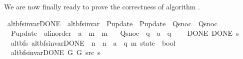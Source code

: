 \begin{isabellebody}
%
\endisatagdocument
{\isafolddocument}%
%
\isadelimdocument
%
\endisadelimdocument
%
\begin{isamarkuptext}%
We are now finally ready to prove the correctness of algorithm .%
\end{isamarkuptext}\isamarkuptrue%
\isamarkupfalse%
\ alt{\isacharunderscore}{\kern0pt}bfs{\isacharunderscore}{\kern0pt}invar{\isacharunderscore}{\kern0pt}DONE\ {\isacharequal}{\kern0pt}\ alt{\isacharunderscore}{\kern0pt}bfs{\isacharunderscore}{\kern0pt}invar\ \ P{\isacharunderscore}{\kern0pt}update\ {\isacharequal}{\kern0pt}\ P{\isacharunderscore}{\kern0pt}update\ \ Q{\isacharunderscore}{\kern0pt}snoc\ {\isacharequal}{\kern0pt}\ Q{\isacharunderscore}{\kern0pt}snoc\ \isanewline
\ \ P{\isacharunderscore}{\kern0pt}update\ {\isacharcolon}{\kern0pt}{\isacharcolon}{\kern0pt}\ {\isachardoublequoteopen}{\isacharprime}{\kern0pt}a{\isacharcolon}{\kern0pt}{\isacharcolon}{\kern0pt}linorder\ {\isasymRightarrow}\ {\isacharprime}{\kern0pt}a\ {\isasymRightarrow}\ {\isacharprime}{\kern0pt}m\ {\isasymRightarrow}\ {\isacharprime}{\kern0pt}m{\isachardoublequoteclose}\ \isanewline
\ \ Q{\isacharunderscore}{\kern0pt}snoc\ {\isacharcolon}{\kern0pt}{\isacharcolon}{\kern0pt}\ {\isachardoublequoteopen}{\isacharprime}{\kern0pt}q\ {\isasymRightarrow}\ {\isacharprime}{\kern0pt}a\ {\isasymRightarrow}\ {\isacharprime}{\kern0pt}q{\isachardoublequoteclose}\ {\isacharplus}{\kern0pt}\isanewline
\ \ \ DONE{\isacharcolon}{\kern0pt}\ {\isachardoublequoteopen}DONE\ s{\isachardoublequoteclose}\isanewline
%
\isadeliminvisible
\isanewline
%
\endisadeliminvisible
%
\isataginvisible
{}\isamarkupfalse%
\ {\isacharparenleft}{\kern0pt}\ alt{\isacharunderscore}{\kern0pt}bfs{\isacharparenright}{\kern0pt}\ alt{\isacharunderscore}{\kern0pt}bfs{\isacharunderscore}{\kern0pt}invar{\isacharunderscore}{\kern0pt}DONE{\isacharprime}{\kern0pt}\ {\isacharcolon}{\kern0pt}{\isacharcolon}{\kern0pt}\ {\isachardoublequoteopen}{\isacharprime}{\kern0pt}n\ {\isasymRightarrow}\ {\isacharprime}{\kern0pt}n\ {\isasymRightarrow}\ {\isacharprime}{\kern0pt}a\ {\isasymRightarrow}\ {\isacharparenleft}{\kern0pt}{\isacharprime}{\kern0pt}q{\isacharcomma}{\kern0pt}\ {\isacharprime}{\kern0pt}m{\isacharparenright}{\kern0pt}\ state\ {\isasymRightarrow}\ bool{\isachardoublequoteclose}\ \isanewline
\ \ {\isachardoublequoteopen}alt{\isacharunderscore}{\kern0pt}bfs{\isacharunderscore}{\kern0pt}invar{\isacharunderscore}{\kern0pt}DONE{\isacharprime}{\kern0pt}\ G{}\ G{}\ src\ s\ {\isasymequiv}\isanewline

\end{isabellebody}

